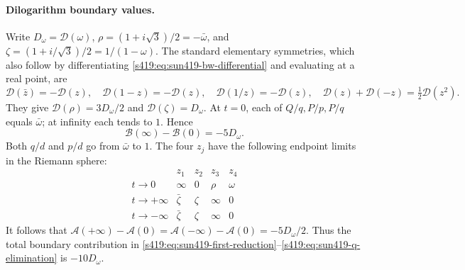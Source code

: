 \documentclass[11pt,a4paper]{article}
\theoremstyle{remark}\newtheorem{remark}[theorem]{Remark}
\numberwithin{equation}{section}
\begin{document}
\paragraph{Dilogarithm boundary values.}
Write $D_\omega=\mathcal D(\omega)$,
$\rho=(1+i\sqrt3)/2=-\bar\omega$, and
$\zeta=(1+i/\sqrt3)/2=1/(1-\omega)$.
The standard elementary symmetries, which also follow by differentiating
\eqref{s419:eq:sun419-bw-differential} and evaluating at a real point, are
\[
 \mathcal D(\bar z)=-\mathcal D(z),\quad
 \mathcal D(1-z)=-\mathcal D(z),\quad
 \mathcal D(1/z)=-\mathcal D(z),\quad
 \mathcal D(z)+\mathcal D(-z)=\tfrac12\mathcal D(z^2).
\]
They give $\mathcal D(\rho)=3D_\omega/2$ and
$\mathcal D(\zeta)=D_\omega$.
At $t=0$, each of $Q/q,P/p,P/q$ equals $\bar\omega$;
at infinity each tends to $1$. Hence
\[
 \mathcal B(\infty)-\mathcal B(0)=-5D_\omega.
\]
Both $q/d$ and $p/d$ go from $\bar\omega$ to $1$.
The four $z_j$ have the following endpoint limits in the Riemann sphere:
\[
\begin{array}{c|cccc}
 &z_1&z_2&z_3&z_4\\\hline
 t\to0&\infty&0&\rho&\omega\\
 t\to+\infty&\bar\zeta&\zeta&\infty&0\\
 t\to-\infty&\bar\zeta&\zeta&\infty&0
\end{array}
\]
It follows that $\mathcal A(+\infty)-\mathcal A(0)
=\mathcal A(-\infty)-\mathcal A(0)=-5D_\omega/2$.
Thus the total boundary contribution in
\eqref{s419:eq:sun419-first-reduction}--\eqref{s419:eq:sun419-q-elimination}
is $-10D_\omega$.
\end{document}

